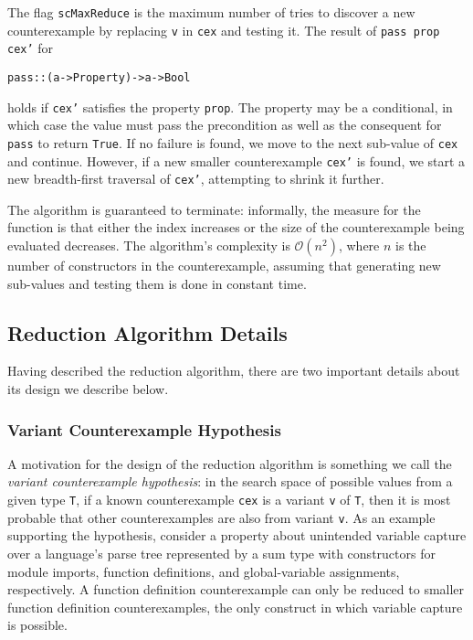 \documentclass{sigplanconf}
\newenvironment{code}{\begin{alltt}\footnotesize}{\end{alltt}}
\newcommand{\ttp}[1]{\texttt{#1}}
\begin{document}
The flag \ttp{scMaxReduce} is the maximum number of tries to discover a new
counterexample by replacing \ttp{v} in \ttp{cex} and testing it.  The result of
\ttp{pass prop cex'} for
%
\begin{code}
pass :: (a -> Property) -> a -> Bool
\end{code}
%
\noindent
holds if \ttp{cex'} satisfies the property \ttp{prop}.  The property may be a
conditional, in which case the value must pass the precondition as well as the
consequent for \ttp{pass} to return \ttp{True}.  If no failure is found, we move
to the next sub-value of \ttp{cex} and continue.  However, if a new smaller
counterexample \ttp{cex'} is found, we start a new breadth-first traversal of
\ttp{cex'}, attempting to shrink it further.

The algorithm is guaranteed to terminate: informally, the measure for the
function is that either the index increases or the size of the counterexample
being evaluated decreases.  The algorithm's complexity is
$\mathcal{O}(n^2)$, where $n$ is the number of constructors in the
counterexample, assuming that generating new sub-values and testing them is done
in constant time.

\subsection{Reduction Algorithm Details}\label{sec:details}
Having described the reduction algorithm, there are two important details about
its design we describe below.

\subsubsection{Variant Counterexample Hypothesis}
A motivation for the design of the reduction algorithm is something we call the
\emph{variant counterexample hypothesis}: in the search space of possible values
from a given type \ttp{T}, if a known counterexample \ttp{cex} is a variant
\ttp{v} of \ttp{T}, then it is most probable that other counterexamples are also
from variant \ttp{v}.  As an example supporting the hypothesis, consider a
property about unintended variable capture over a language's parse tree
represented by a sum type with constructors for module imports, function
definitions, and global-variable assignments, respectively.  A function
definition counterexample can only be reduced to smaller function definition
counterexamples, the only construct in which variable capture is possible.
\end{document}
